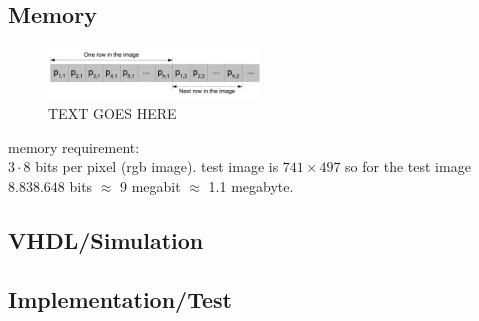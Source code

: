 \subsection*{Memory}
\begin{figure}
  \centering
  \includegraphics[width=0.5\textwidth]{figures/memdata.jpg}
  \caption{TEXT GOES HERE}
  \label{fig:LABEL}
\end{figure}

memory requirement: \\
$3 \cdot 8$ bits per pixel (rgb image). test image is $741 \times 497$ so for the test image $8.838.648$ bits $\approx$ 9 megabit $\approx$ 1.1 megabyte.

\subsection*{VHDL/Simulation}

\subsection*{Implementation/Test}

